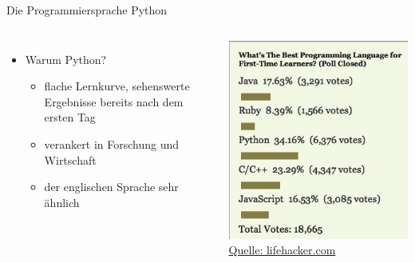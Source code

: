 \begin{frame}{Die Programmiersprache Python}
\begin{columns}
    \begin{itemize}
        \item Warum Python?
            \begin{itemize}
                \item flache Lernkurve, sehenswerte Ergebnisse bereits nach dem ersten Tag
                \item verankert in Forschung und Wirtschaft
                \item der englischen Sprache sehr ähnlich
            \end{itemize}
    \end{itemize}
    \centering\includegraphics[scale=0.5]{images/best_lang} 
    \hyperlink{https://lifehacker.com/five-best-programming-languages-for-first-time-learners-1494256243}{\tiny{Quelle: lifehacker.com}}
\end{columns}
\end{frame}

